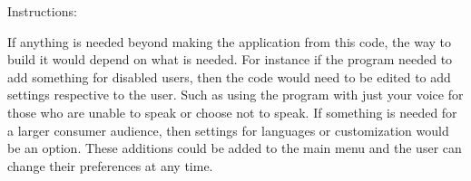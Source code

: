 Instructions\+:
\begin{DoxyItemize}
\item If anything is needed beyond making the application from this code, the way to build it would depend on what is needed. For instance if the program needed to add something for disabled users, then the code would need to be edited to add settings respective to the user. Such as using the program with just your voice for those who are unable to speak or choose not to speak. If something is needed for a larger consumer audience, then settings for languages or customization would be an option. These additions could be added to the main menu and the user can change their preferences at any time. 
\end{DoxyItemize}